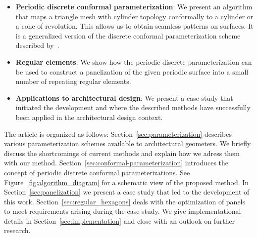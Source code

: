 \documentclass[article.tex]{subfiles}
\begin{document}
\begin{itemize}
\item {\bf Periodic discrete conformal parameterization}:
  We present an algorithm that maps a triangle mesh with cylinder
  topology conformally to a cylinder or a cone of revolution. This
  allows us to obtain seamless patterns on surfaces. It is a
  generalized version of the discrete conformal parameterization
  scheme described by~\cite{SSP08}.
\item {\bf Regular elements}:
  We show how the periodic discrete parameterization can be used to
  construct a panelization of the given periodic surface into a small
  number of repeating regular elements.
\item {\bf Applications to architectural design}: 
  We present a case study that initiated the development and where the
  described methods have successfully been applied in the architectural design
  context.
\end{itemize}

The article is organized as follows:
Section~\ref{sec:parameterization} describes various parameterization
schemes available to architectural geometers. We briefly discuss the
shortcomings of current methods and explain how we adress them with our method.
Section~\ref{sec:conformal-parameterization} introduces the concept of
periodic discrete conformal parameterizations.  See
Figure~\ref{fig:algorithm_diagram} for a schematic view of the
proposed method. In Section~\ref{sec:panelization} we present a case
study that led to the development of this
work. Section~\ref{sec:regular_hexagons} deals with the optimization
of panels to meet requirements arising during the case study. We give
implementational details in Section~\ref{sec:implementation} and close
with an outlook on further research.

\subfilebibliography
\end{document}
